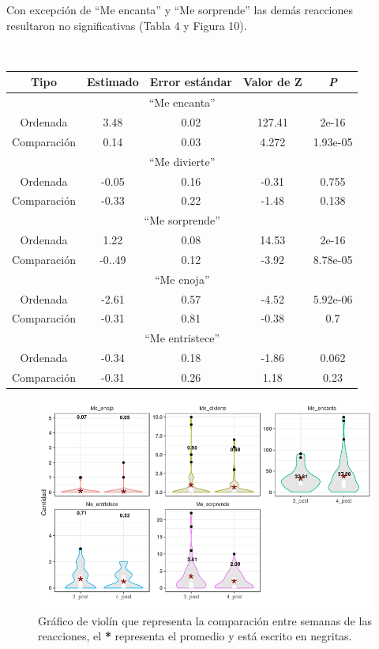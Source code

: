 \documentclass[a4paper,10pt]{article}
\begin{document}
Con excepción de ``Me encanta'' y ``Me sorprende'' las demás reacciones resultaron
no significativas (Tabla 4 y Figura 10).

\begin{center}
 \caption{Tabla 4: Resumen del GLM de la comparación entre semanas de las reacciones de los posteos.} \\ [0.3cm]
 {\footnotesize
 \begin{tabular}{c|c|c|c|c}
  \hline 
  Tipo & Estimado & Error estándar & Valor de Z & \textit{P} \\
  \hline 
  \multicolumn{5}{c}{``Me encanta''} \\
  \hline
  Ordenada & 3.48 & 0.02 & 127.41 & 2e-16 \\
  Comparación & 0.14 & 0.03 & 4.272 & 1.93e-05 \\
  \hline 
  \multicolumn{5}{c}{``Me divierte''}\\
  \hline
  Ordenada & -0.05 & 0.16 & -0.31 & 0.755 \\
  Comparación & -0.33 & 0.22 & -1.48 & 0.138 \\
  \hline
  \multicolumn{5}{c}{``Me sorprende''}\\
  \hline
  Ordenada & 1.22 & 0.08 & 14.53 & 2e-16\\
  Comparación & -0..49 & 0.12 & -3.92 & 8.78e-05 \\
  \hline
  \multicolumn{5}{c}{``Me enoja''}\\
  \hline
  Ordenada & -2.61 & 0.57 & -4.52 & 5.92e-06\\
  Comparación & -0.31 & 0.81 & -0.38 & 0.7 \\
  \hline
  \multicolumn{5}{c}{``Me entristece''} \\
  \hline
  Ordenada & -0.34 & 0.18 & -1.86 & 0.062\\
  Comparación & -0.31 & 0.26 & 1.18 & 0.23 \\
  \hline
 \end{tabular}
 }	    
\end{center}

\begin{figure}[H]
 \begin{center}
  \includegraphics[width=.75\textwidth]{imagenes/graficas/comparacion3.png}
  \caption{Gráfico de violín que representa la comparación entre semanas de  las reacciones, 
  el \textbf{*} representa el promedio y está escrito en negritas.}
 \end{center}
\end{figure}
\end{document}
